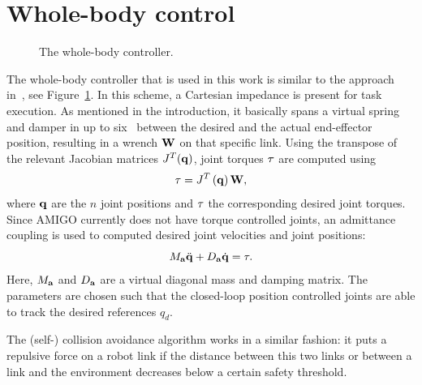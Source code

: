\section{Whole-body control}\label{wbp:sec:wbc}
\begin{figure}[t]
    \begin{center}
        \footnotesize
        \def\svgwidth{\linewidth}
        
        \caption{The whole-body controller.}
        \label{wbp:fig:wbc}
    \end{center}
\end{figure}
The whole-body controller that is used in this work is similar to the approach in~\citet{Dietrich2012}, see Figure~\ref{wbp:fig:wbc}. In this scheme, a Cartesian impedance is present for task execution. As mentioned in the introduction, it basically spans a virtual spring and damper in up to six \dofs\ between the desired and the actual end-effector position, resulting in a wrench $\mathbf{W}$ on that specific link. Using the transpose of the relevant Jacobian matrices $J^T(\mathbf{q})$, joint torques $\mathbf{\tau}$ are computed using
\begin{equation}
    \mathbf{\tau} = J^T\left(\mathbf{q}\right)\mathbf{W},
\end{equation}
where $\mathbf{q}$ are the $n$ joint positions and $\mathbf{\tau}$ the corresponding desired joint torques. Since AMIGO currently does not have torque controlled joints, an admittance coupling is used to computed desired joint velocities and joint positions:
\begin{equation}
    M_{\mathbf{a}} \ddot {\mathbf{q}} + D_{\mathbf{a}} \dot {\mathbf{q}} = \mathbf{\tau}.
\end{equation}
Here, $M_{\mathbf{a}}$ and $D_{\mathbf{a}}$ are a virtual diagonal mass and damping matrix. The parameters are chosen such that the closed-loop position controlled joints are able to track the desired references $q_d$.

The (self-) collision avoidance algorithm works in a similar fashion: it puts a repulsive force on a robot link if the distance between this two links or between a link and the environment decreases below a certain safety threshold.

